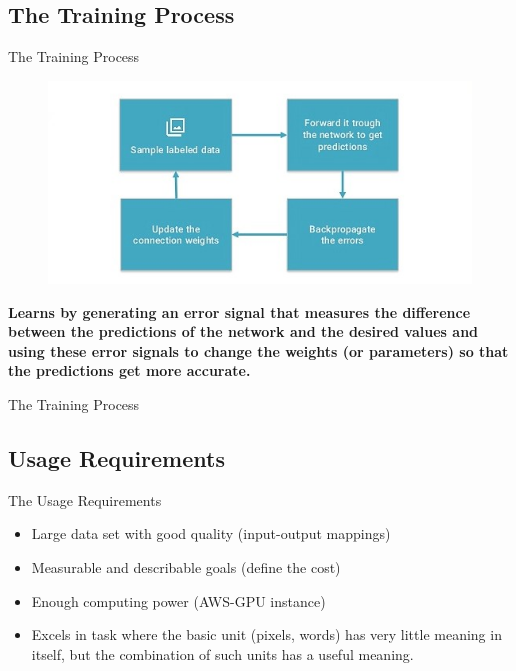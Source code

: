 \documentclass[10pt]{beamer}
\begin{document}
	\subsection{The Training Process}
	\begin{frame}{The Training Process}
		\begin{figure}
			\includegraphics[width=\linewidth]{images/ttp}
		\end{figure}
		\textbf{Learns by generating an error signal that measures the difference between the predictions of the network and the desired values and using these error signals to change the weights (or parameters) so that the predictions get more accurate.}
	\end{frame}
	\begin{frame}{The Training Process}
	\end{frame}
	\subsection{Usage Requirements}
	\begin{frame}{The Usage Requirements}
		\large{\begin{itemize}
				\item<1> Large data set with good quality (input-output mappings)
				\item<2> Measurable and describable goals (define the cost)
				\item<3> Enough computing power (AWS-GPU instance)
				\item<4> Excels in task where the basic unit (pixels, words) has very little meaning in itself, but the \alert{combination of such units has a useful meaning}. 
			\end{itemize}
		}
	\end{frame}
\end{document}
